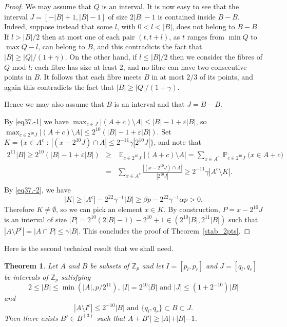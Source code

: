 \documentclass[12pt,reqno]{amsart}
\DeclareMathOperator*{\E}{\mathbb{E}}
\DeclareMathOperator*{\Prob}{\mathbb{P}}
\newtheorem{theorem}{Theorem}
\theoremstyle{definition}
\renewcommand\leq{\leqslant}
\renewcommand\geq{\geqslant}
\begin{document}
\begin{proof}
We may assume that $Q$ is an interval. It is now easy to see that the interval $J=[-|B|+1,|B|-1]$ of size
$2|B|-1$ is contained inside $B-B$. Indeed, suppose instead that some $l$, with $0<l<|B|$, does not belong to
$B-B$. If $l>|B|/2$ then at most one of each pair $(t,t+l)$, as $t$ ranges from $\min Q$ to $\max Q - l$, can
belong to $B$, and this contradicts the fact that $|B| \geq |Q|/(1+\gamma)$. On the other hand, if
$l \leq |B|/2$ then we consider the fibres of $Q$ mod $l$: each fibre has size at least 2, and no fibre can have
two consecutive points in $B$. It follows that each fibre meets $B$ in at most $2/3$ of its points, and again this
contradicts the fact that $|B| \geq |Q|/(1+\gamma)$.

Hence we may also assume that $B$ is an interval and that $J=B-B$.

\noindent
By \eqref{eq37.-1} we have $\max_{c\in J} |(A+c)\setminus A| \leq |B|-1+\varepsilon|B|$, so
$\max_{c\in 2^{10}J} |(A+c)\setminus A| \leq 2^{10}(|B|-1+\varepsilon|B|)$.
Set
$K=\{x \in A^c \text{ : } |(x-2^{10}J) \cap A| \leq 2^{-11}\gamma |2^{10}J|    \}$,
and note that
\begin{eqnarray*}
    2^{11}|B|\geq 2^{10}(|B|-1+\varepsilon|B|)
    &\geq& \E_{c\in 2^{10}J}|(A+c)\setminus A|
    =\sum_{x \in A^c} \Prob_{c \in 2^{10}J} \bigg( x \in A+c \bigg)\\
    &=&\sum_{x \in A^c} \frac{|(x-2^{10}J)\cap A|}{|2^{10}J|}
    \geq 2^{-11}\gamma |A^c\setminus K|.\\
\end{eqnarray*}
By \eqref{eq37.-2}, we have
\[
    |K| \geq |A^c|-2^{22}\gamma^{-1}|B|
    \geq \beta p -  2^{22} \gamma^{-1} \alpha p
    >0.
\]
Therefore $K\not= \emptyset$, so we can pick an element $x \in K$. By construction,
$P=x-2^{10}J$
is an interval of size
$|P| = 2^{10}(2|B|-1)-2^{10}+1 \in (2^{10}|B|, 2^{11}|B|)$
such that
$|A\setminus P^c|=|A\cap P| \leq \gamma |B|.$
This concludes the proof of Theorem~\ref{stab_2pts}.
\end{proof}

\vspace{5pt}
Here is the second technical result that we shall need.
\begin{theorem}\label{general_3pts}
Let $A$ and $B$ be subsets of $\mathbb{Z}_p$ and let $I=[p_l, p_r]$ and $J=[q_l, q_r]$ be intervals of $\mathbb{Z}_p$ satisfying
\begin{equation}\label{eq39.-2}
2\leq |B| \leq \min(|A|, p/2^{11}) \text{, } |I|=2^{10}|B| \text{ and } |J| \leq (1+2^{-10})|B|
\end{equation}
and
\begin{equation}\label{eq39.-1}
|A\setminus I^c| \leq 2^{-10} |B| \text{ and } \{q_l,q_r\} \subset B \subset J.
\end{equation}
Then there exists
$B'\in B^{(3)}$ such that $A+B'|\geq |A|+|B|-1$.
\end{theorem}
\end{document}
